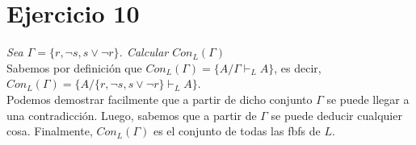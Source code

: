 \documentclass[osajnl,twocolumn,showpacs,superscriptaddress,10pt,leqno]{revtex4-1} %
\begin{document}
\section{Ejercicio 10}

\textit{Sea $\Gamma = \{r, \neg s, s \vee \neg r\}$. Calcular $Con_L(\Gamma)$} \\

Sabemos por definición que $Con_L(\Gamma) = \{A / \Gamma \vdash_L A\}$, es decir, $Con_L(\Gamma) = \{A / \{r, \neg s, s \vee \neg r\} \vdash_L A\}$. \\

Podemos demostrar facilmente que a partir de dicho conjunto $\Gamma$ se puede llegar a una contradicción. Luego, sabemos que a partir de $\Gamma$ se puede deducir cualquier cosa. Finalmente,
$Con_L(\Gamma)$ es el conjunto de todas las fbfs de $L$. 
\end{document}
